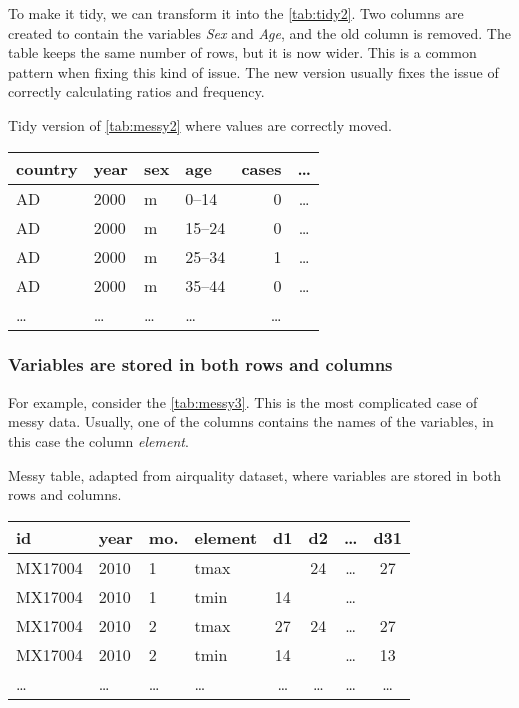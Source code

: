 To make it tidy, we can transform it into the \cref{tab:tidy2}.  Two columns are created
to contain the variables \emph{Sex} and \emph{Age}, and the old column is removed.  The
table keeps the same number of rows, but it is now wider.  This is a common pattern when
fixing this kind of issue.  The new version usually fixes the issue of correctly
calculating ratios and frequency.

\begin{tablebox}[label=tab:tidy2]{Tidy version of \cref{tab:messy2} where values are correctly moved.}
  \centering
  \begin{tabular}{l l l l r c}
    \toprule
    \textbf{country} & \textbf{year} & \textbf{sex} & \textbf{age} & \textbf{cases} & \textbf{\dots} \\
    \midrule
    AD & 2000 & m & 0--14 & 0 & \dots \\
    AD & 2000 & m & 15--24 & 0 & \dots \\
    AD & 2000 & m & 25--34 & 1 & \dots \\
    AD & 2000 & m & 35--44 & 0 & \dots \\
    \dots & \dots & \dots & \dots & \dots \\
    \bottomrule
  \end{tabular}
\end{tablebox}

\clearpage
\subsubsection{Variables are stored in both rows and columns}  For example, consider the
\cref{tab:messy3}.  This is the most complicated case of messy data.  Usually, one of the
columns contains the names of the variables, in this case the column \emph{element}.

\begin{tablebox}[label=tab:messy3]{Messy table, adapted from airquality dataset, where variables are stored in both rows and columns.}
  \centering
  \begin{tabular}{llllcccc}
    \toprule
    \textbf{id} & \textbf{year} & \textbf{mo.} & \textbf{element} & \textbf{d1} & \textbf{d2} & \textbf{\dots} & \textbf{d31} \\
    \midrule
    MX17004 & 2010 & 1 & tmax &    & 24 & \dots & 27 \\
    MX17004 & 2010 & 1 & tmin & 14 &    & \dots &    \\
    MX17004 & 2010 & 2 & tmax & 27 & 24 & \dots & 27 \\
    MX17004 & 2010 & 2 & tmin & 14 &    & \dots & 13 \\
    \dots & \dots & \dots & \dots & \dots & \dots & \dots & \dots \\
    \bottomrule
  \end{tabular}
\end{tablebox}

